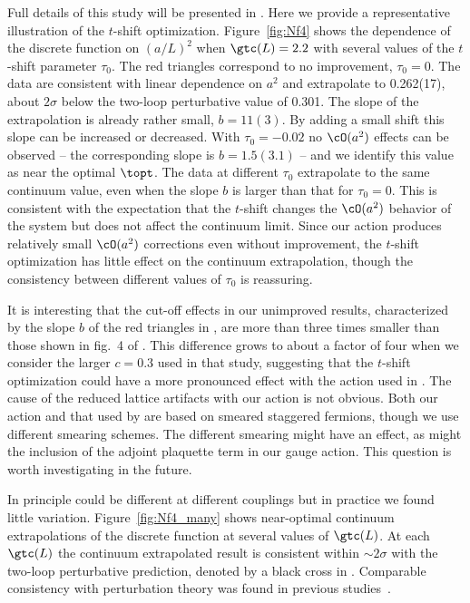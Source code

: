 Full details of this study will be presented in .
Here we provide a representative illustration of the $t$-shift optimization.
Figure~\ref{fig:Nf4} shows the dependence of the discrete \be function on $(a / L)^2$ when $\gtc(L) = 2.2$ with several values of the $t$-shift parameter $\tau_0$.
The red triangles correspond to no improvement, $\tau_0 = 0$.
The data are consistent with linear dependence on $a^2$ and extrapolate to 0.262(17), about $2\sigma$ below the two-loop perturbative value of 0.301.
The slope of the extrapolation is already rather small, $b = 11(3)$.
By adding a small shift this slope can be increased or decreased.
With $\tau_0 = -0.02$ no $\cO(a^2)$ effects can be observed -- the corresponding slope is $b = 1.5(3.1)$ -- and we identify this value as near the optimal $\topt$.
The data at different $\tau_0$ extrapolate to the same continuum value, even when the slope $b$ is larger than that for $\tau_0 = 0$.
This is consistent with the expectation that the $t$-shift changes the $\cO(a^2)$ behavior of the system but does not affect the continuum limit.
Since our action produces relatively small $\cO(a^2)$ corrections even without improvement, the $t$-shift optimization has little effect on the continuum extrapolation, though the consistency between different values of $\tau_0$ is reassuring.

It is interesting that the cut-off effects in our unimproved results, characterized by the slope $b$ of the red triangles in , are more than three times smaller than those shown in fig.~4 of .
This difference grows to about a factor of four when we consider the larger $c = 0.3$ used in that study, suggesting that the $t$-shift optimization could have a more pronounced effect with the action used in .
The cause of the reduced lattice artifacts with our action is not obvious.
Both our action and that used by  are based on smeared staggered fermions, though we use different smearing schemes.
The different smearing might have an effect, as might the inclusion of the adjoint plaquette term in our gauge action.
This question is worth investigating in the future.

In principle \topt could be different at different \gc couplings but in practice we found little variation.
Figure~\ref{fig:Nf4_many} shows near-optimal continuum extrapolations of the discrete \be function at several values of $\gtc(L)$.
At each $\gtc(L)$ the continuum extrapolated result is consistent within $\sim$$2\sigma$ with the two-loop perturbative prediction, denoted by a black cross in .
Comparable consistency with perturbation theory was found in previous studies~\cite{Tekin:2010mm, PerezRubio:2010ke, Fodor:2012td, Fodor:2012qh}.
